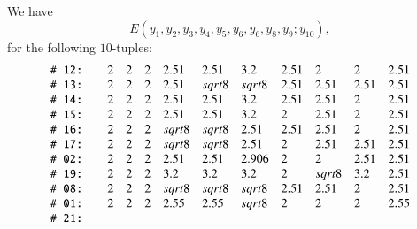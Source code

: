 \begin{tarskidata}
\begin{tarski}

\begin{lemma}
We have 
   $$
   E(y_1,y_2,y_3,y_4,y_5,y_6,y_6,y_8,y_9;y_{10}),
   $$
for the following $10$-tuples:
$$
\def\tuid#1{\relax} %
\def\rr#1{\text{\tt \# #1:}}
\begin{array}{llllllllllll}
%
 \rr{12}&\tuid{EKTYKKO}\tlabel{tarski:E:part4:4}
   &    2 &2 &2 &  2.51& 2.51 &3.2&   2.51 & 2 & 2 & 2.51\\
%
 \rr{13}&\tuid{TZKIBQD}\tlabel{tarski:E:part4:5}
   &2 &2 &2 &2.51& \sqrt{8} &\sqrt{8}& 2.51 & 2.51 & 2.51 & 2.51\\
%
 \rr{14}&\tuid{NYHXWOU}\tlabel{tarski:E:part4:6}
   &2 &2 &2 &2.51& 2.51 &3.2& 2.51 & 2.51 & 2 & 2.51\\
%
 \rr{15}&\tuid{HCEDPSK}\tlabel{tarski:E:part4:7}
   &2 &2 &2 &2.51& 2.51 &3.2& 2 & 2.51 & 2 & 2.51\\
%
 \rr{16}&\tuid{ZDKFOUK}\tlabel{tarski:E:part4:8}
   &2 &2 &2 &\sqrt{8}& \sqrt{8} &2.51& 2.51 & 2.51 & 2 &  2.51\\
%
 \rr{17}&\tuid{OQXGZCQ}\tlabel{tarski:E:part4:9}
   &2 &2 &2 &\sqrt{8}& \sqrt{8} &2.51& 2 & 2.51 & 2.51 &  2.51\\
%
 \rr{02}&\tuid{SDUXZXL}\tlabel{tarski:E1453}
   &2 &2 &2 &2.51& 2.51 &2.906& 2 & 2 &2.51 & 2.51\\
%
 \rr{19}&\tuid{QFJLWUC}\tlabel{tarski:dcg-p142}
   &2 &2 &2 &   3.2& 3.2 &3.2&   2 & \sqrt8 & 3.2 &  2.51\\
%
 \rr{08}&\tuid{TVBTKEK}\tlabel{tarski:node}
   &2 &2 &2 &\sqrt8& \sqrt8 &\sqrt8& 2.51 & 2.51 & 2 & 2.51\\ 
%
 \rr{01}&\tuid{GVKETKP} \tlabel{tarski:2t0-doesnt-pass-through}%
   &2 &2 &2 & 2.55&  2.55 & \sqrt{8}&  2 & 2 & 2 & 2.55\\
 \rr{21}&\tuid{RPIOZZC}\tlabel{tarski:last:E}%

\end{array}$$
\end{lemma}
\end{tarski}
\end{tarskidata}
